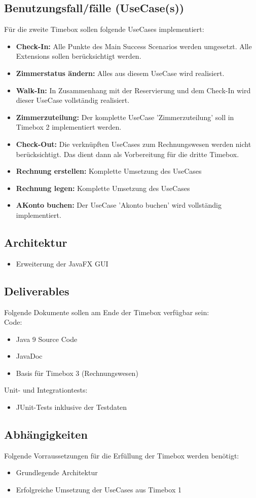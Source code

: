 \documentclass[../Pflichtenheft.tex]{subfiles}
\begin{document}
    \subsection{Benutzungsfall/fälle (UseCase(s)) }
    Für die zweite Timebox sollen folgende UseCases implementiert:
    \begin{itemize}
        \item \textbf{Check-In:} Alle Punkte des Main Success Scenarios werden umgesetzt.
        Alle Extensions sollen berücksichtigt werden.
        \item \textbf{Zimmerstatus ändern: } Alles aus diesem UseCase wird realisiert.
        \item \textbf{Walk-In: } In Zusammenhang mit der Reservierung und dem Check-In wird dieser UseCase vollständig realisiert.
        \item \textbf{Zimmerzuteilung: } Der komplette UseCase 'Zimmerzuteilung' soll in Timebox 2 implementiert werden.
        \item \textbf{Check-Out:} Die verknüpften UseCases zum Rechnungswesen werden nicht berücksichtigt. Das dient dann als Vorbereitung für die dritte Timebox.
        \item \textbf{Rechnung erstellen:} Komplette Umsetzung des UseCases
        \item \textbf{Rechnung legen:} Komplette Umsetzung des UseCases
        \item \textbf{AKonto buchen: } Der UseCase 'Akonto buchen' wird vollständig implementiert.
    \end{itemize}
    \subsection{Architektur}
    \begin{itemize}
        \item Erweiterung der JavaFX GUI
    \end{itemize}
    \subsection{Deliverables}
    Folgende Dokumente sollen am Ende der Timebox verfügbar sein: \\
    Code:
    \begin{itemize}
        \item Java 9 Source Code
        \item JavaDoc
        \item Basis für Timebox 3 (Rechnungswesen)
    \end{itemize}
    Unit- und Integrationtests:
    \begin{itemize}
        \item JUnit-Tests inklusive der Testdaten
    \end{itemize}
    \subsection{Abhängigkeiten}
    Folgende Vorraussetzungen für die Erfüllung der Timebox werden benötigt:
    \begin{itemize}
        \item Grundlegende Architektur
        \item Erfolgreiche Umsetzung der UseCases aus Timebox 1
    \end{itemize}
\end{document}
